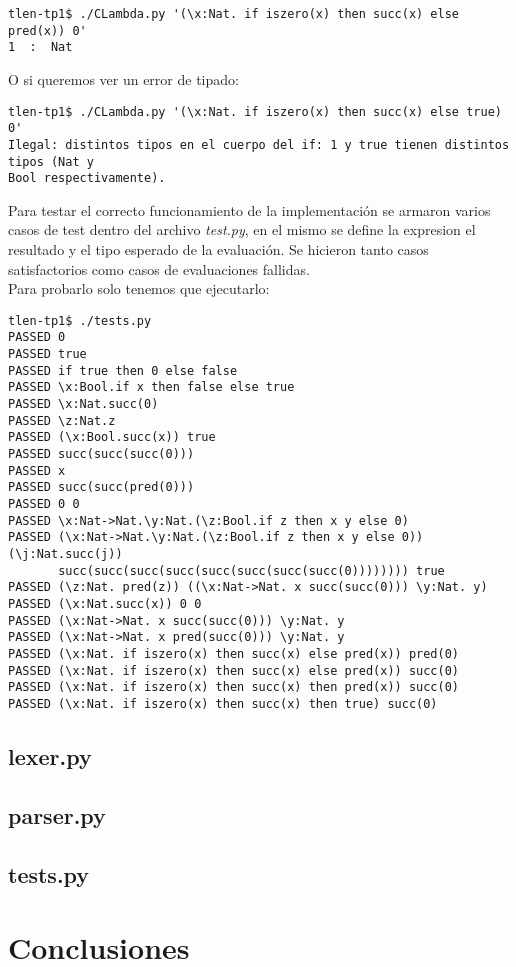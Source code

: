 \documentclass[spanish, a4paper]{article}
\begin{document}
\begin{verbatim}
tlen-tp1$ ./CLambda.py '(\x:Nat. if iszero(x) then succ(x) else pred(x)) 0'
1  :  Nat
\end{verbatim}

O si queremos ver un error de tipado:

\begin{verbatim}
tlen-tp1$ ./CLambda.py '(\x:Nat. if iszero(x) then succ(x) else true) 0'
Ilegal: distintos tipos en el cuerpo del if: 1 y true tienen distintos tipos (Nat y 
Bool respectivamente).
\end{verbatim}

Para testar el correcto funcionamiento de la implementación se armaron varios casos de test dentro del archivo \textit{test.py}, en el mismo se define la expresion el resultado y el tipo esperado de la evaluación. Se hicieron tanto casos satisfactorios como casos de evaluaciones fallidas.\\
Para probarlo solo tenemos que ejecutarlo:


\begin{verbatim}
tlen-tp1$ ./tests.py 
PASSED 0
PASSED true
PASSED if true then 0 else false
PASSED \x:Bool.if x then false else true
PASSED \x:Nat.succ(0)
PASSED \z:Nat.z
PASSED (\x:Bool.succ(x)) true
PASSED succ(succ(succ(0)))
PASSED x
PASSED succ(succ(pred(0)))
PASSED 0 0
PASSED \x:Nat->Nat.\y:Nat.(\z:Bool.if z then x y else 0)
PASSED (\x:Nat->Nat.\y:Nat.(\z:Bool.if z then x y else 0)) (\j:Nat.succ(j))
       succ(succ(succ(succ(succ(succ(succ(succ(0)))))))) true
PASSED (\z:Nat. pred(z)) ((\x:Nat->Nat. x succ(succ(0))) \y:Nat. y)
PASSED (\x:Nat.succ(x)) 0 0
PASSED (\x:Nat->Nat. x succ(succ(0))) \y:Nat. y
PASSED (\x:Nat->Nat. x pred(succ(0))) \y:Nat. y
PASSED (\x:Nat. if iszero(x) then succ(x) else pred(x)) pred(0)
PASSED (\x:Nat. if iszero(x) then succ(x) else pred(x)) succ(0)
PASSED (\x:Nat. if iszero(x) then succ(x) then pred(x)) succ(0)
PASSED (\x:Nat. if iszero(x) then succ(x) then true) succ(0)
\end{verbatim}

\newpage
\subsection{lexer.py}
      
\newpage
\subsection{parser.py}
      
\newpage
\subsection{tests.py}
      
\section{Conclusiones}

%

\end{document}
